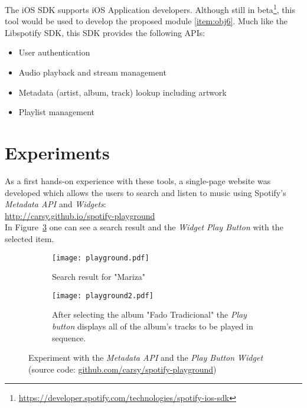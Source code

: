     The iOS SDK supports iOS Application developers. Although still in beta\footnote{\url{https://developer.spotify.com/technologies/spotify-ios-sdk}}, this tool would be used to develop the proposed module \ref{item:obj6}.
    Much like the Libspotify SDK, this SDK provides the following APIs:

    \begin{itemize}
      \item User authentication
      \item Audio playback and stream management
      \item Metadata (artist, album, track) lookup including artwork
      \item Playlist management
    \end{itemize}



  \section{Experiments} %
  \label{sec:experiments}

    As a first hands-on experience with these tools, a single-page website was developed which allows the users to search and listen to music using Spotify's \emph{Metadata API} and \emph{Widgets}: \\

    \url{http://carsy.github.io/spotify-playground} \\

    In Figure~\ref{fig:playground} one can see a search result and the \emph{Widget Play Button} with the selected item.

    \begin{figure}
      \centering

      \begin{subfigure}{0.38\textwidth}
        \texttt{[image: playground.pdf]}
        \caption{Search result for "Mariza"}
        \label{fig:playgroun_a}
      \end{subfigure}

      \begin{subfigure}{0.38\textwidth}
        \texttt{[image: playground2.pdf]}
        \caption{After selecting the album "Fado Tradicional" the \emph{Play button} displays all of the album's tracks to be played in sequence.}
        \label{fig:playground_b}
      \end{subfigure}

      \caption{Experiment with the \emph{Metadata API} and the \emph{Play Button Widget} (source code: \url{github.com/carsy/spotify-playground})}
      \label{fig:playground}

    \end{figure}

